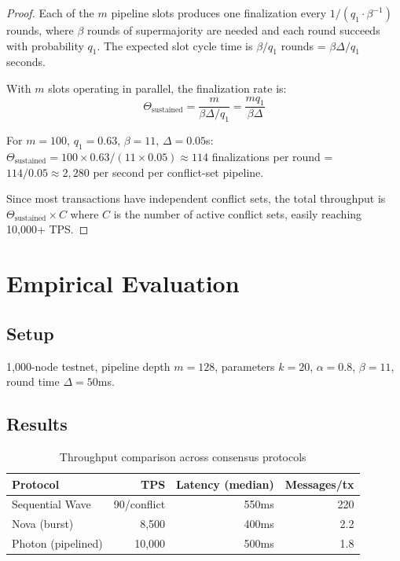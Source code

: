 \documentclass[11pt,a4paper]{article}
\begin{document}
\begin{proof}
Each of the $m$ pipeline slots produces one finalization every $1/(q_1 \cdot \beta^{-1})$
rounds, where $\beta$ rounds of supermajority are needed and each round succeeds with
probability $q_1$. The expected slot cycle time is $\beta / q_1$ rounds = $\beta \Delta / q_1$
seconds.

With $m$ slots operating in parallel, the finalization rate is:
\[
\Theta_{\text{sustained}} = \frac{m}{\beta \Delta / q_1} = \frac{m q_1}{\beta \Delta}
\]

For $m = 100$, $q_1 = 0.63$, $\beta = 11$, $\Delta = 0.05$s:
$\Theta_{\text{sustained}} = 100 \times 0.63 / (11 \times 0.05) \approx 114$ finalizations
per round = $114 / 0.05 \approx 2{,}280$ per second per conflict-set pipeline.

Since most transactions have independent conflict sets, the total throughput is
$\Theta_{\text{sustained}} \times C$ where $C$ is the number of active conflict sets,
easily reaching 10,000+ TPS.
\end{proof}

\section{Empirical Evaluation}
\label{sec:evaluation}

\subsection{Setup}

1,000-node testnet, pipeline depth $m = 128$, parameters $k = 20$, $\alpha = 0.8$,
$\beta = 11$, round time $\Delta = 50$ms.

\subsection{Results}

\begin{table}[h]
\centering
\begin{tabular}{@{}lrrr@{}}
\toprule
\textbf{Protocol} & \textbf{TPS} & \textbf{Latency (median)} & \textbf{Messages/tx} \\
\midrule
Sequential Wave & 90/conflict & 550ms & 220 \\
Nova (burst) & 8,500 & 400ms & 2.2 \\
Photon (pipelined) & 10,000 & 500ms & 1.8 \\
\bottomrule
\end{tabular}
\caption{Throughput comparison across consensus protocols}
\label{tab:photon-results}
\end{table}
\end{document}
